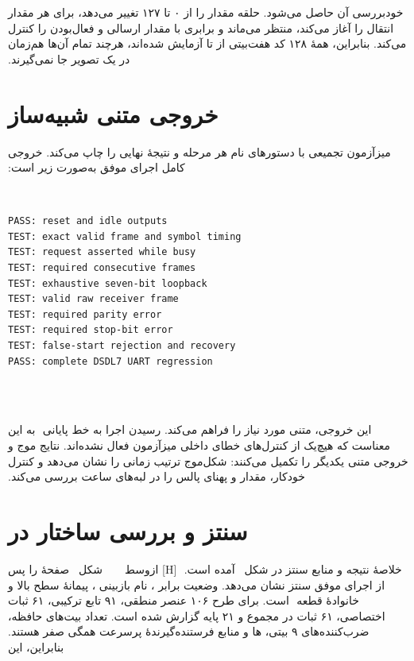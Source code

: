 ‫خودبررسی آن حاصل می‌شود. حلقه مقدار  را از ۰ تا ۱۲۷ تغییر می‌دهد، برای هر مقدار
‫انتقال را آغاز می‌کند، منتظر  می‌ماند و برابری  با
‫مقدار ارسالی و فعال‌بودن  را کنترل می‌کند. بنابراین، همهٔ ۱۲۸ کد
‫هفت‌بیتی از  تا  آزمایش شده‌اند، هرچند تمام آن‌ها هم‌زمان در یک تصویر
‫جا نمی‌گیرند.
‫
‫
‫\section{خروجی متنی شبیه‌ساز}
‫
‫میزآزمون تجمیعی با دستورهای  نام هر مرحله و نتیجهٔ نهایی را چاپ می‌کند.
‫خروجی کامل اجرای موفق به‌صورت زیر است:
‫
‫\begin{dsdlcodeblock}
‫\begin{verbatim}
‫PASS: reset and idle outputs
‫TEST: exact valid frame and symbol timing
‫TEST: request asserted while busy
‫TEST: required consecutive frames
‫TEST: exhaustive seven-bit loopback
‫TEST: valid raw receiver frame
‫TEST: required parity error
‫TEST: required stop-bit error
‫TEST: false-start rejection and recovery
‫PASS: complete DSDL7 UART regression
‫\end{verbatim}
‫\end{dsdlcodeblock}
‫
‫این خروجی،  متنی مورد نیاز را فراهم می‌کند. رسیدن اجرا به خط پایانی
‫ به این معناست که هیچ‌یک از کنترل‌های خطای داخلی میزآزمون فعال نشده‌اند. نتایج
‫موج و خروجی متنی یکدیگر را تکمیل می‌کنند: شکل‌موج ترتیب زمانی را نشان می‌دهد و کنترل
‫خودکار، مقدار و پهنای پالس را در لبه‌های ساعت بررسی می‌کند.
‫
‫
‫\section{سنتز و بررسی ساختار در }
‫
‫خلاصهٔ نتیجه و منابع سنتز در
‫شکل~ آمده است.
‫
‫[H]
‫‌ازوسط
‫
‫
‫
‫
‫
‫شکل~ صفحهٔ  را پس از
‫اجرای موفق سنتز نشان می‌دهد. وضعیت  برابر
‫، نام بازبینی ، پیمانهٔ سطح بالا  و خانوادهٔ قطعه
‫ است. برای طرح ۱۰۶ عنصر منطقی، ۹۱ تابع
‫ترکیبی، ۶۱ ثبات
‫اختصاصی، ۶۱ ثبات در مجموع و ۲۱
‫پایه گزارش شده است. تعداد بیت‌های حافظه، ضرب‌کننده‌های ۹ بیتی،
‫ها و منابع فرستنده‌گیرندهٔ پرسرعت همگی صفر هستند. بنابراین، این
